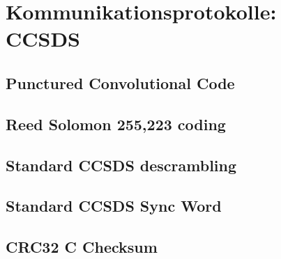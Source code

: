 \section{Kommunikationsprotokolle: CCSDS}

\subsection{Punctured Convolutional Code}

\subsection{Reed Solomon 255,223 coding}

\subsection{Standard CCSDS descrambling}

\subsection{Standard CCSDS Sync Word}

\subsection{CRC32 C Checksum}